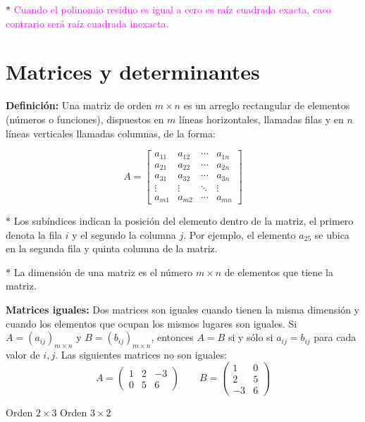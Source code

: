 \documentclass[11pt,a4paper]{article}
\begin{document}
\medskip
$\ast$ \textcolor{magenta}{Cuando el polinomio residuo es igual a cero es raíz cuadrada
exacta, caso contrario será raíz cuadrada inexacta.}


\newpage
\section{Matrices y determinantes}

\textbf{Definición:} Una matriz de orden $m\times n$ es un arreglo rectangular de elementos
(números o funciones), dispuestos en $m$ líneas horizontales, llamadas filas y en $n$
líneas verticales llamadas columnas, de la forma:

\begin{minipage}{0.436\textwidth}
\[
A = \begin{bmatrix}
a_{11} & a_{12} & \cdots & a_{1n}\\
a_{21} & a_{22} & \cdots & a_{2n}\\
a_{31} & a_{32} & \cdots & a_{3n}\\
\vdots & \vdots & \ddots & \vdots\\
a_{m1} & a_{m2} & \cdots & a_{mn}
\end{bmatrix}
\]
\end{minipage}\hfill
\begin{minipage}{0.533\textwidth}
$\ast$ Los subíndices indican la posición del elemento dentro de la matriz, el primero
denota la fila $i$ y el segundo la columna $j$. Por ejemplo, el elemento $a_{25}$ se
ubica en la segunda fila y quinta columna de la matriz.

$\ast$ La dimensión de una matriz es el número $m\times n$ de elementos que tiene la matriz.
\end{minipage}

\medskip
\textbf{Matrices iguales:} Dos matrices son iguales cuando tienen la misma dimensión y
cuando los elementos que ocupan los mismos lugares son iguales. Si
$A = (a_{ij})_{m\times n}$ y $B = (b_{ij})_{m\times n}$, entonces $A = B$ si y sólo si
$a_{ij} = b_{ij}$ para cada valor de $i, j$. Las siguientes matrices no son iguales:
\[
A = \begin{pmatrix} 1 & 2 & -3\\ 0 & 5 & 6 \end{pmatrix}
\qquad
B = \begin{pmatrix} 1 & 0\\ 2 & 5\\ -3 & 6 \end{pmatrix}
\]
\begin{center}
\textcolor{naranja}{Orden $2\times3$} \hspace{3cm} \textcolor{naranja}{Orden $3\times2$}
\end{center}
\end{document}
